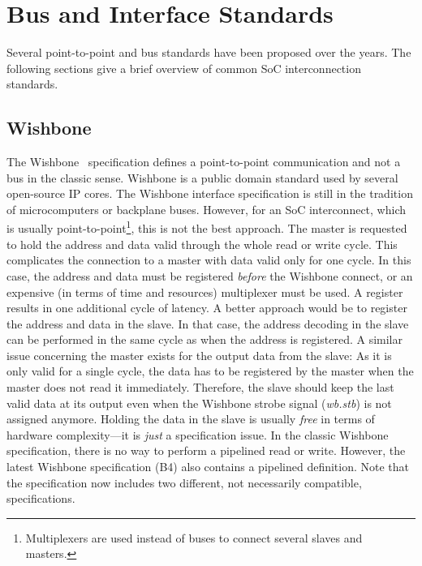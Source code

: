 \documentclass[%
    10pt,
    headinclude, footexclude,
    openright, %
    notitlepage,
    cleardoubleempty,
    headsepline,
    pointlessnumbers,
    bibtotoc, idxtotoc,
    ]{scrbook}
\newcommand{\todo}[1]{{\emph{TODO: #1}}}
\renewcommand{\todo}[1]{}
\begin{document}


\todo{decoding Chisel code, but maybe in the Leros section when building a complete system.}

\todo{Next step to multiple masters and a generic interconnect (cloud)}

\section{Bus and Interface Standards}

Several point-to-point and bus standards have been proposed over the
years. The following sections give a brief overview of common
SoC interconnection standards.

\subsection{Wishbone}

The Wishbone~\cite{soc:wishbone} specification defines
a point-to-point communication and not a bus in the classic sense.
Wishbone is a public domain standard used by
several open-source IP cores. The Wishbone interface specification
is still in the tradition of microcomputers or backplane buses.
However, for an SoC interconnect, which is usually
point-to-point\footnote{Multiplexers are used instead of buses to
connect several slaves and masters.}, this is not the best approach.
The master is requested to hold the address and data valid through
the whole read or write cycle. This complicates the connection to a
master with data valid only for one cycle. In this case, the
address and data must be registered \emph{before} the Wishbone
connect, or an expensive (in terms of time and resources) multiplexer must be
used. A register results in one additional cycle of latency. A better
approach would be to register the address and data in the slave. In
that case, the address decoding in the slave can be performed in the
same cycle as when the address is registered. A similar issue concerning
the master exists for the output data from the slave: As
it is only valid for a single cycle, the data has to be registered by
the master when the master does not read it immediately. Therefore,
the slave should keep the last valid data at its output even when
the Wishbone strobe signal (\emph{wb.stb}) is not assigned anymore.
Holding the data in the slave is usually \emph{free} in terms of
hardware complexity---it is \emph{just} a specification issue. In
the classic Wishbone specification, there is no way to perform a pipelined read
or write. However, the latest Wishbone specification (B4) also contains
a pipelined definition. Note that the specification now includes two
different, not necessarily compatible, specifications.
\end{document}
